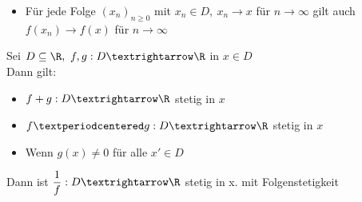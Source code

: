 \begin{itemize}
\item{Für jede Folge $(x_n)_{n\geq 0}$ mit $x_n\in D,\ x_n→x$ für $n→∞$ gilt auch $f(x_n)→f(x)$ für $n→∞$}
\end{itemize}
%
\satz
Sei $D\subseteq\R,\ f,g:D→\R$ in $x\in D$\\
Dann gilt:\\
\begin{itemize}
\item{$f+g:D→\R$ stetig in $x$}
\item{$f·g:D→\R$ stetig in $x$}
\item{Wenn $g(x)\neq 0$ für alle $x'\in D$}
\end{itemize}
Dann ist $\dfrac{1}{f}:D→\R$ stetig in x.
\bew
mit Folgenstetigkeit
